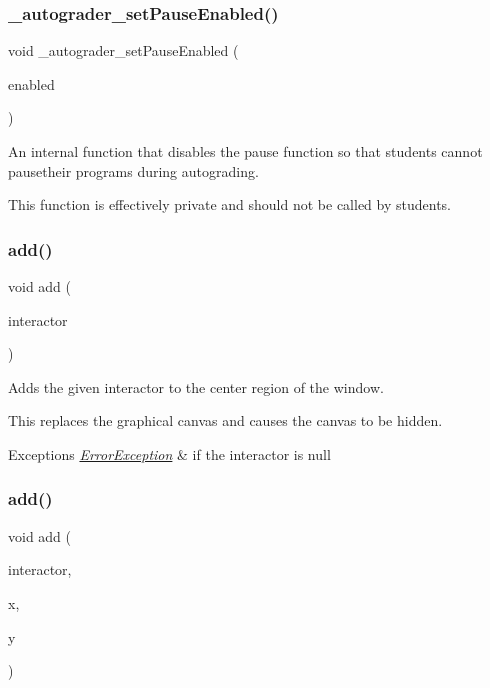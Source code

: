 \subsubsection{\texorpdfstring{\+\_\+autograder\+\_\+set\+Pause\+Enabled()}{\_autograder\_setPauseEnabled()}}
{\footnotesize\ttfamily void \+\_\+autograder\+\_\+set\+Pause\+Enabled (\begin{DoxyParamCaption}\item[{bool}]{enabled }\end{DoxyParamCaption})\hspace{0.3cm}{\ttfamily [static]}}



An internal function that disables the pause function so that students cannot pausetheir programs during autograding. 

This function is effectively private and should not be called by students. \mbox{\label{classGWindow_a6f99b7c841256dbdc5acaafbbca4e685}} 
\subsubsection{\texorpdfstring{add()}{add()}\hspace{0.1cm}{\footnotesize\ttfamily [1/8]}}
{\footnotesize\ttfamily void add (\begin{DoxyParamCaption}\item[{\mbox{\hyperlink{classGInteractor}{G\+Interactor}} $\ast$}]{interactor }\end{DoxyParamCaption})\hspace{0.3cm}{\ttfamily [virtual]}}



Adds the given interactor to the center region of the window. 

This replaces the graphical canvas and causes the canvas to be hidden. 
\begin{DoxyExceptions}{Exceptions}
{\em \mbox{\hyperlink{classErrorException}{Error\+Exception}}} & if the interactor is null \\
\hline
\end{DoxyExceptions}
\mbox{\label{classGWindow_aca25fb0fc7d200e9c4fd23830d2d413d}} 
\subsubsection{\texorpdfstring{add()}{add()}\hspace{0.1cm}{\footnotesize\ttfamily [2/8]}}
{\footnotesize\ttfamily void add (\begin{DoxyParamCaption}\item[{\mbox{\hyperlink{classGInteractor}{G\+Interactor}} $\ast$}]{interactor,  }\item[{double}]{x,  }\item[{double}]{y }\end{DoxyParamCaption})\hspace{0.3cm}{\ttfamily [virtual]}}



